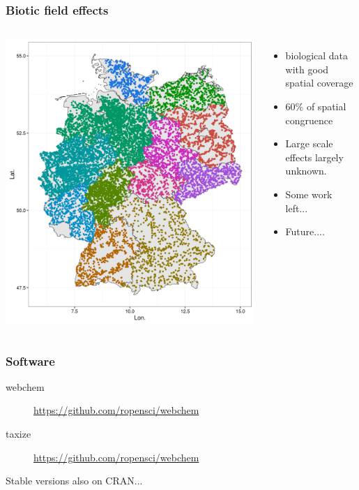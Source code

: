 \documentclass[10pt
	]{beamer}
\begin{document}
\begin{frame}
\frametitle{Biotic field effects}
	\begin{columns}
	    	    	\includegraphics[width=\textwidth, keepaspectratio]{figs/mzb_map.png}
	        \begin{itemize}
	        	\item biological data with good spatial coverage
	        	\item 60\% of spatial congruence 
	        	\item Large scale effects largely unknown.
	        	\item Some work left...
	        	\item Future....
	        \end{itemize}
	\end{columns}

\end{frame}


\begin{frame}
\frametitle{Software}
\begin{description}
	\item[webchem]{\url{https://github.com/ropensci/webchem}}
	\item[taxize]{\url{https://github.com/ropensci/webchem}}
\end{description}

Stable versions also on CRAN...

\end{frame}



\end{document}
